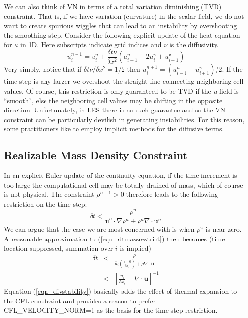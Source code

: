 We can also think of VN in terms of a total variation diminishing (TVD) constraint.  That is, if we have variation (curvature) in the scalar field, we do not want to create spurious wiggles that can lead to an instability by overshooting the smoothing step.  Consider the following explicit update of the heat equation for $u$ in 1D. Here subscripts indicate grid indices and $\nu$ is the diffusivity.
\begin{equation}
u_i^{n+1} = u_i^n + \frac{\delta t \nu}{\delta x^2} (u_{i-1}^n - 2u_i^n + u_{i+1}^n )
\end{equation}
Very simply, notice that if $\delta t \nu/\delta x^2 = 1/2$ then $u_i^{n+1} = (u_{i-1}^n + u_{i+1}^n)/2$.  If the time step is any larger we overshoot the straight line connecting neighboring cell values.  Of course, this restriction is only guaranteed to be TVD if the $u$ field is ``smooth'', else the neighboring cell values may be shifting in the opposite direction.  Unfortunately, in LES there is no such guarantee and so the VN constraint can be particularly devilish in generating instabilities. For this reason, some practitioners like to employ implicit methods for the diffusive terms.

\subsection{Realizable Mass Density Constraint}

In an explicit Euler update of the continuity equation, if the time increment is too large the computational cell may be totally drained of mass, which of course is not physical. The constraint $\rho^{n+1}>0$ therefore leads to the following restriction on the time step:
\begin{equation}
\label{eqn_dtmassrestrict}
\delta t < \frac{\rho^n}{\overline{\mathbf{u}}^n\cdot\nabla\rho^n + \rho^n \nabla\cdot\mathbf{u}^n}
\end{equation}
We can argue that the case we are most concerned with is when $\rho^n$ is near zero.  A reasonable approximation to (\ref{eqn_dtmassrestrict}) then becomes (time location suppressed, summation over $i$ is implied)
\begin{eqnarray}
\label{eqn_divstability}
\delta t &<& \frac{\rho}{\overline{u}_i \left(\frac{\rho-0}{\delta x_i}\right) + \rho \nabla\cdot\mathbf{u}} \nonumber\\
&<& \left[ \frac{\overline{u}_i}{\delta x_i} + \nabla\cdot\mathbf{u} \right]^{-1}
\end{eqnarray}
Equation (\ref{eqn_divstability}) basically adds the effect of thermal expansion to the CFL constraint and provides a reason to prefer {\ct CFL\_VELOCITY\_NORM=1} as the basis for the time step restriction.


